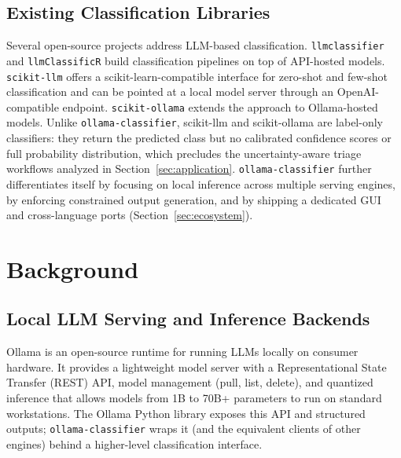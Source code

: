 \documentclass[11pt,a4paper]{article}
\begin{document}
\subsection{Existing Classification Libraries}

Several open-source projects address LLM-based classification.
\texttt{llmclassifier} \citep{cvxtz2023llmclassifier} and
\texttt{llmClassificR} \citep{golino2023llmclassificr} build classification
pipelines on top of API-hosted models. \texttt{scikit-llm}
\citep{ScikitLLM} offers a scikit-learn-compatible interface for zero-shot
and few-shot classification and can be pointed at a local model server
through an OpenAI-compatible endpoint. \texttt{scikit-ollama} \citep{skollama} extends the 
approach to Ollama-hosted models. Unlike \texttt{ollama-classifier},
scikit-llm and scikit-ollama are label-only classifiers: they return the predicted class but no
calibrated confidence scores or full probability distribution, which precludes
the uncertainty-aware triage workflows analyzed in
Section~\ref{sec:application}. \texttt{ollama-classifier} further
differentiates itself by focusing on local inference across multiple serving
engines, by enforcing constrained output generation, and by shipping a
dedicated GUI and cross-language ports (Section~\ref{sec:ecosystem}).

\section{Background}
\label{sec:background}

\subsection{Local LLM Serving and Inference Backends}

Ollama \citep{ollama} is an open-source runtime for running LLMs locally on
consumer hardware. It provides a lightweight model server with a
Representational State Transfer (REST) API,
model management (pull, list, delete), and quantized inference that allows
models from 1B to 70B+ parameters to run on standard workstations. The Ollama
Python library \citep{ollama_python} exposes this API and structured outputs;
\texttt{ollama-classifier} wraps it (and the equivalent clients of other
engines) behind a higher-level classification interface.
\end{document}
